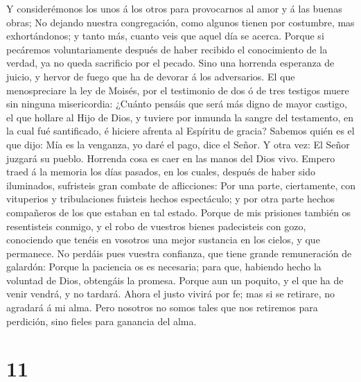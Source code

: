  Y considerémonos los unos á los otros para provocarnos al
amor y á las buenas obras;  No dejando nuestra
congregación, como algunos tienen por costumbre, mas exhortándonos; y
tanto más, cuanto veis que aquel día se acerca.  Porque si
pecáremos voluntariamente después de haber recibido el conocimiento de
la verdad, ya no queda sacrificio por el pecado.  Sino una
horrenda esperanza de juicio, y hervor de fuego que ha de devorar á los
adversarios.  El que menospreciare la ley de Moisés, por el
testimonio de dos ó de tres testigos muere sin ninguna misericordia:
 ¿Cuánto pensáis que será más digno de mayor castigo, el
que hollare al Hijo de Dios, y tuviere por inmunda la sangre del
testamento, en la cual fué santificado, é hiciere afrenta al Espíritu de
gracia?  Sabemos quién es el que dijo: Mía es la venganza,
yo daré el pago, dice el Señor. Y otra vez: El Señor juzgará su pueblo.
 Horrenda cosa es caer en las manos del Dios vivo.
 Empero traed á la memoria los días pasados, en los cuales,
después de haber sido iluminados, sufristeis gran combate de
aflicciones:  Por una parte, ciertamente, con vituperios y
tribulaciones fuisteis hechos espectáculo; y por otra parte hechos
compañeros de los que estaban en tal estado.  Porque de mis
prisiones también os resentisteis conmigo, y el robo de vuestros bienes
padecisteis con gozo, conociendo que tenéis en vosotros una mejor
sustancia en los cielos, y que permanece.  No perdáis pues
vuestra confianza, que tiene grande remuneración de galardón:
 Porque la paciencia os es necesaria; para que, habiendo
hecho la voluntad de Dios, obtengáis la promesa.  Porque
aun un poquito, y el que ha de venir vendrá, y no tardará. 
Ahora el justo vivirá por fe; mas si se retirare, no agradará á mi alma.
 Pero nosotros no somos tales que nos retiremos para
perdición, sino fieles para ganancia del alma.

\hypertarget{section-10}{%
\section{11}\label{section-10}}

